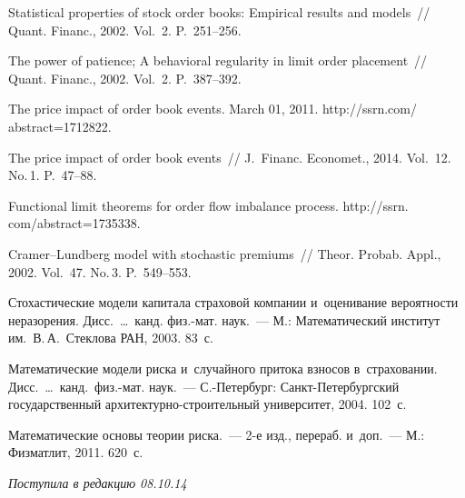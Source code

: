 \begin{multicols}{2}
{{\begin{thebibliography}{99}
  Statistical properties of
stock order books: Empirical results and models~// Quant. Financ., 2002.
Vol.~2. P.~251--256.

  The power of patience; A behavioral regularity
in limit order placement~// Quant. Financ., 2002. Vol.~2. P.~387--392.



The price impact of order book
events. March 01, 2011.
{\sf http://ssrn.com/ abstract=1712822}.

 The price impact of order book
events~// J.~Financ. Economet., 2014. Vol.~12. No.\,1. P.~47--88.

Functional limit theorems for order flow imbalance process.
{\sf http://ssrn. com/abstract=1735338}.


 Cramer--Lundberg model with stochastic premiums~//
Theor. Probab. Appl., 2002. Vol.~47. No.\,3. P.~549--553.

 Стохастические модели капитала страховой
компании и~оценивание вероятности неразорения.  Дисс.\ \ldots\ канд.
физ.-мат. наук.~--- М.: Математический институт им.\ В.\,А.~Стеклова
РАН, 2003. 83~с.

 Математические модели риска и~случайного
притока взносов в~страховании. Дисс.\ \ldots\ канд.\
 физ.-мат. наук.~---
С.-Пе\-тер\-бург: Санкт-Пе\-тер\-бург\-ский государственный
ар\-хи\-тек\-тур\-но-стро\-и\-тель\-ный университет, 2004. 102~с.

Математические основы теории риска.~--- 2-е изд., перераб. и~доп.~---
М.: Физматлит, 2011. 620~с.
 \end{thebibliography}

 }
 }

\end{multicols}

\vspace*{-6pt}

\hfill{\small\textit{Поступила в редакцию 08.10.14}}


\vspace*{12pt}

